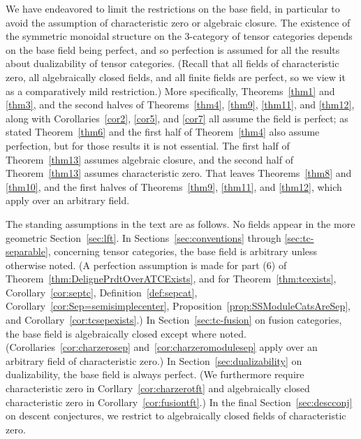 \documentclass{amsart}
\begin{document}
\begin{assumpfield*}
We have endeavored to limit the restrictions on the base field, in particular to avoid the assumption of characteristic zero or algebraic closure.  The existence of the symmetric monoidal structure on the 3-category of tensor categories depends on the base field being perfect, and so perfection is assumed for all the results about dualizability of tensor categories.  (Recall that all fields of characteristic zero, all algebraically closed fields, and all finite fields are perfect, so we view it as a comparatively mild restriction.)  More specifically, Theorems~\ref{thm1} and \ref{thm3}, and the second halves of Theorems~\ref{thm4}, \ref{thm9}, \ref{thm11}, and \ref{thm12}, along with Corollaries~\ref{cor2}, \ref{cor5}, and \ref{cor7} all assume the field is perfect; as stated Theorem~\ref{thm6} and the first half of Theorem~\ref{thm4} also assume perfection, but for those results it is not essential.  The first half of Theorem~\ref{thm13} assumes algebraic closure, and the second half of Theorem~\ref{thm13} assumes characteristic zero.  That leaves Theorems~\ref{thm8} and \ref{thm10}, and the first halves of Theorems~\ref{thm9}, \ref{thm11}, and \ref{thm12}, which apply over an arbitrary field.  

The standing assumptions in the text are as follows.  No fields appear in the more geometric Section~\ref{sec:lft}.  In Sections~\ref{sec:conventions} through \ref{sec:tc-separable}, concerning tensor categories, the base field is arbitrary unless otherwise noted.  (A perfection assumption is made for part (6) of Theorem~\ref{thm:DelignePrdtOverATCExists}, and for Theorem~\ref{thm:tcexists}, Corollary~\ref{cor:septc}, Definition~\ref{def:sepcat}, Corollary~\ref{cor:Sep=semisimplecenter}, Proposition~\ref{prop:SSModuleCatsAreSep}, and Corollary~\ref{cor:tcsepexists}.)  In Section~\ref{sec:tc-fusion} on fusion categories, the base field is algebraically closed except where noted.  (Corollaries~\ref{cor:charzerosep} and~\ref{cor:charzeromodulesep} apply over an arbitrary field of characteristic zero.)  In Section~\ref{sec:dualizability} on dualizability, the base field is always perfect. (We furthermore require characteristic zero in Corllary~\ref{cor:charzerotft} and algebraically closed characteristic zero in Corollary~\ref{cor:fusiontft}.)  In the final Section~\ref{sec:descconj} on descent conjectures, we restrict to algebraically closed fields of characteristic zero.
\end{assumpfield*}
\end{document}

